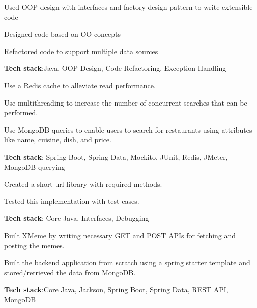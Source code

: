 \documentclass[]{deedy-resume-openfont}
\begin{document}
\begin{minipage}[t]{0.66\textwidth}

\begin{tightemize}
\item Used OOP design with interfaces and factory design pattern to write extensible code
\item Designed code based on OO concepts
\item Refactored code to support multiple data sources
\item \textbf{Tech stack}:Java, OOP Design, Code Refactoring, Exception Handling
\end{tightemize}


\begin{tightemize}
\item Use a Redis cache to alleviate read performance.
\item Use multithreading to increase the number of concurrent searches that can be performed.
\item Use MongoDB queries to enable users to search for restaurants using attributes like name, cuisine, dish, and price.

\item \textbf{Tech stack}: Spring Boot, Spring Data, Mockito, JUnit, Redis, JMeter, MongoDB querying
\end{tightemize}



\begin{tightemize}
\item Created a short url library with required methods.
\item Tested this implementation with test cases.
\item \textbf{Tech stack}: Core Java, Interfaces, Debugging
\end{tightemize}




\begin{tightemize}
\item Built XMeme by writing necessary GET and POST APIs for fetching and posting the memes.
\item Built the backend application from scratch using a spring starter template and stored/retrieved the data from MongoDB.
\item \textbf{Tech stack}:Core Java, Jackson, Spring Boot, Spring Data, REST API, MongoDB
\end{tightemize}



\end{minipage}
\end{document}
